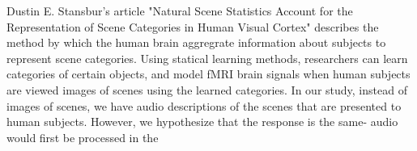 \par \indent Dustin E. Stansbur's article "Natural Scene Statistics Account for the Representation of 
Scene Categories in Human Visual Cortex" describes the method by which the human brain 
aggregrate information about subjects to represent scene categories. Using statical learning 
methods, researchers can learn categories of certain objects, and model fMRI brain signals 
when human subjects are viewed images of scenes using the learned categories. In our study, 
instead of images of scenes, we have audio descriptions of the scenes that are presented to 
human subjects. However, we hypothesize that the response is the same- audio would first be 
processed in the

